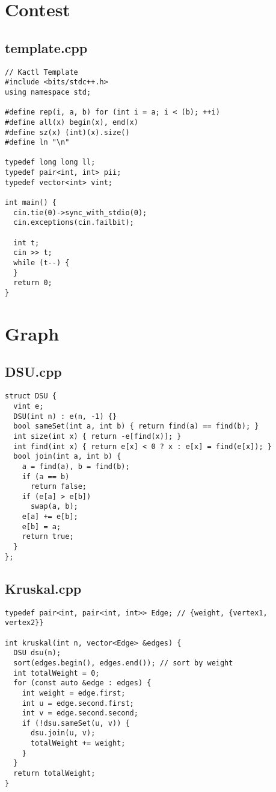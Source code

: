 \documentclass[10pt]{article}
\author{Rohit Dasgupta}
\begin{document}
\begin{multicols*}{3}
\section*{Contest}
\nopagebreak[4]
\subsection*{template.cpp}
\nopagebreak[4]
\begin{lstlisting}
// Kactl Template
#include <bits/stdc++.h>
using namespace std;

#define rep(i, a, b) for (int i = a; i < (b); ++i)
#define all(x) begin(x), end(x)
#define sz(x) (int)(x).size()
#define ln "\n"

typedef long long ll;
typedef pair<int, int> pii;
typedef vector<int> vint;

int main() {
  cin.tie(0)->sync_with_stdio(0);
  cin.exceptions(cin.failbit);

  int t;
  cin >> t;
  while (t--) {
  }
  return 0;
}

\end{lstlisting}
\section*{Graph}
\nopagebreak[4]
\subsection*{DSU.cpp}
\nopagebreak[4]
\begin{lstlisting}
struct DSU {
  vint e;
  DSU(int n) : e(n, -1) {}
  bool sameSet(int a, int b) { return find(a) == find(b); }
  int size(int x) { return -e[find(x)]; }
  int find(int x) { return e[x] < 0 ? x : e[x] = find(e[x]); }
  bool join(int a, int b) {
    a = find(a), b = find(b);
    if (a == b)
      return false;
    if (e[a] > e[b])
      swap(a, b);
    e[a] += e[b];
    e[b] = a;
    return true;
  }
};

\end{lstlisting}
\subsection*{Kruskal.cpp}
\nopagebreak[4]
\begin{lstlisting}
typedef pair<int, pair<int, int>> Edge; // {weight, {vertex1, vertex2}}

int kruskal(int n, vector<Edge> &edges) {
  DSU dsu(n);
  sort(edges.begin(), edges.end()); // sort by weight
  int totalWeight = 0;
  for (const auto &edge : edges) {
    int weight = edge.first;
    int u = edge.second.first;
    int v = edge.second.second;
    if (!dsu.sameSet(u, v)) {
      dsu.join(u, v);
      totalWeight += weight;
    }
  }
  return totalWeight;
}


\end{lstlisting}
\end{multicols*}
\end{document}
